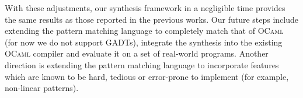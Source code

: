  With these adjustments, our synthesis framework in a negligible time provides the same results as those reported in the previous works.
 Our future steps include extending the pattern matching language to completely match that of \textsc{OCaml} (for
 now we do not support GADTs), integrate the synthesis into the existing \textsc{OCaml} compiler and evaluate it on a
 set of real-world programs. Another direction is extending the pattern matching language to incorporate features which
 are known to be hard, tedious or error-prone to implement (for example, non-linear patterns).
 
 \begin{comment}
 
 
 Real world modern compilers are obliged to address a few problems which are NP-complete and hence can't have effective
 algorithm to solve them. So, compilers use semi-optimal algorithms to find a decent solution. Optimal algorithms require
 brute force search to get the best solution and  affect compilation speed negatively. In this work we apply relational
 programming -- a convenient DSL for implementing search -- to compilation of pattern matching, one of a kind hard problems for compiler.
 
 The task of compiling pattern matching for typed languages is well presented in literature~\cite{maranget2001,maranget2008}.
 
 
 We test approach on simplified source language $PM$ where scrutinee is a value $\in\mathcal{V}$ of algebraic data type, only wildcards
 and nested constructors are allowed as patterns $\mathcal{P}$ and right hand side of clause is its index. The source language is easy
 extendable by pattern variables and optional pattern guards that test subterms of scrutinee using a function. The semantics of $PM$
 is a function from concrete scrutinee $s$, concrete patterns $pats$ and concrete guards $gs$ to clause indexes, and is denoted
 as $\sem{s,pats,gs}_{PM} = i$.
 
 Compilation scheme translates sentences from $PM$ to $\ir$ language which has constructions for clause indexes and conditions which
 test matchable values for specific constructor. Matchable values can be either a scrutinee, or a projection of matchable value that
 returns one of its field indexed by natural numbers. $\ir$ language is easy extendable by tests for fixed number of pattern guards.
 The semantics is straightforward and is denoted by $\sem{\cdot}_{\ir}$.
 
 We deal with a task of compiling pattern matching as it is a synthesis problem. The goal of algorithm is to synthesize $ideal_\ir$
 for concrete patterns $pats$ and guards that, firstly, will behave the same as original pattern matching for any possible
 scrutinee $s$. Secondly, we want shortest solution because short code usually runs faster. Relational programming~\cite{OCanren}
 will help with that because it has a tendency to generate short answers earlier, although this tendency is not strict.
 

\end{comment}
